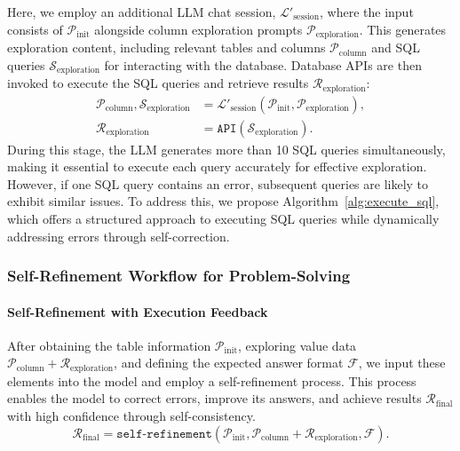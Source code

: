     Here, we employ an additional LLM chat session, $\mathcal{L}'_{\text{session}}$, where the input consists of $\mathcal{P}_{\text{init}}$ alongside column exploration prompts $\mathcal{P}_{\text{exploration}}$. This generates exploration content, including relevant tables and columns $\mathcal{P}_{\text{column}}$ and SQL queries $\mathcal{S}_{\text{exploration}}$ for interacting with the database. Database APIs are then invoked to execute the SQL queries and retrieve results $\mathcal{R}_{\text{exploration}}$:
    \begin{align}
        \mathcal{P}_{\text{column}}, \mathcal{S}_{\text{exploration}} &= \mathcal{L}'_{\text{session}}(\mathcal{P}_{\text{init}}, \mathcal{P}_{\text{exploration}}),\\
        \mathcal{R}_{\text{exploration}} &= \texttt{API}(\mathcal{S}_{\text{exploration}}).
    \end{align}
    During this stage, the LLM generates more than 10 SQL queries simultaneously, making it essential to execute each query accurately for effective exploration. However, if one SQL query contains an error, subsequent queries are likely to exhibit similar issues. To address this, we propose Algorithm~\ref{alg:execute_sql}, which offers a structured approach to executing SQL queries while dynamically addressing errors through self-correction.
        

    \subsubsection{Self-Refinement Workflow for Problem-Solving}
\paragraph{Self-Refinement with Execution Feedback}
    After obtaining the table information $\mathcal{P}_{\text{init}}$, exploring value data $\mathcal{P}_{\text{column}} + \mathcal{R}_{\text{exploration}}$, and defining the expected answer format $\mathcal{F}$, we input these elements into the model and employ a self-refinement process. This process enables the model to correct errors, improve its answers, and achieve results $\mathcal{R}_{\text{final}}$ with high confidence through self-consistency.
    \begin{equation}
        \mathcal{R}_{\text{final}} = \texttt{self-refinement}(\mathcal{P}_{\text{init}}, \mathcal{P}_{\text{column}} + \mathcal{R}_{\text{exploration}}, \mathcal{F}).
    \end{equation}

